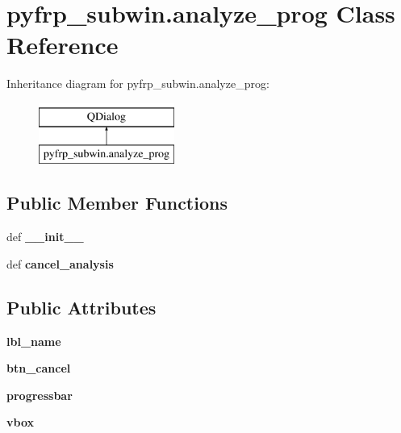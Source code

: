 \hypertarget{classpyfrp__subwin_1_1analyze__prog}{\section{pyfrp\+\_\+subwin.\+analyze\+\_\+prog Class Reference}
\label{classpyfrp__subwin_1_1analyze__prog}
}
Inheritance diagram for pyfrp\+\_\+subwin.\+analyze\+\_\+prog\+:\begin{figure}[H]
\begin{center}
\leavevmode
\includegraphics[height=2.000000cm]{classpyfrp__subwin_1_1analyze__prog}
\end{center}
\end{figure}
\subsection*{Public Member Functions}
\begin{DoxyCompactItemize}
\item 
\hypertarget{classpyfrp__subwin_1_1analyze__prog_a8fee5e11087e59f9070f967292228dfc}{def {\bfseries \+\_\+\+\_\+init\+\_\+\+\_\+}}\label{classpyfrp__subwin_1_1analyze__prog_a8fee5e11087e59f9070f967292228dfc}

\item 
\hypertarget{classpyfrp__subwin_1_1analyze__prog_a453ee0a13df2e43015898ece63498d85}{def {\bfseries cancel\+\_\+analysis}}\label{classpyfrp__subwin_1_1analyze__prog_a453ee0a13df2e43015898ece63498d85}

\end{DoxyCompactItemize}
\subsection*{Public Attributes}
\begin{DoxyCompactItemize}
\item 
\hypertarget{classpyfrp__subwin_1_1analyze__prog_a4b459df088c186083d54431e81ddd3c4}{{\bfseries lbl\+\_\+name}}\label{classpyfrp__subwin_1_1analyze__prog_a4b459df088c186083d54431e81ddd3c4}

\item 
\hypertarget{classpyfrp__subwin_1_1analyze__prog_a5ef873e7e15e686fa18a2fd0c1f73909}{{\bfseries btn\+\_\+cancel}}\label{classpyfrp__subwin_1_1analyze__prog_a5ef873e7e15e686fa18a2fd0c1f73909}

\item 
\hypertarget{classpyfrp__subwin_1_1analyze__prog_ac76f125873f7749076674dc7a3416734}{{\bfseries progressbar}}\label{classpyfrp__subwin_1_1analyze__prog_ac76f125873f7749076674dc7a3416734}

\item 
\hypertarget{classpyfrp__subwin_1_1analyze__prog_a843d47d141e4a9ffc811fa3997a6dbed}{{\bfseries vbox}}\label{classpyfrp__subwin_1_1analyze__prog_a843d47d141e4a9ffc811fa3997a6dbed}

\end{DoxyCompactItemize}



